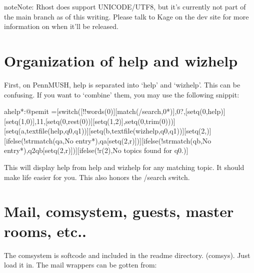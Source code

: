 \documentclass[letterpaper,10pt,english]{sphinxmanual}
\begin{document}
\begin{sphinxadmonition}{note}{Note:}
\sphinxAtStartPar
Rhost does support UNICODE/UTF8, but it’s currently not part of the main
branch as of this writing.  Please talk to Kage on the dev site for more
information on when it’ll be released.
\end{sphinxadmonition}


\section{Organization of help and wizhelp}
\label{\detokenize{differences:organization-of-help-and-wizhelp}}
\sphinxAtStartPar
First, on PennMUSH, help is separated into ‘help’ and ‘wizhelp’.  This can
be confusing. If you want to ‘combine’ them, you may use the following snippit:

\begin{sphinxVerbatim}[commandchars=\\\{\}]
\PYGZdl{}ahelp*:@pemit \PYGZpc{}\PYGZsh{}=[switch([!!words(\PYGZpc{}0)][match(/search,\PYGZpc{}0*)],0?,[setq(0,help)][setq(1,0)],11,[setq(0,rest(\PYGZpc{}0))][setq(1,2)],setq(0,trim(\PYGZpc{}0)))][setq(a,textfile(help,\PYGZpc{}q0,\PYGZpc{}q1))][setq(b,textfile(wizhelp,\PYGZpc{}q0,\PYGZpc{}q1))][setq(2,)][ifelse(!strmatch(\PYGZpc{}qa,No entry*),\PYGZpc{}qa[setq(2,\PYGZpc{}r)])][ifelse(!strmatch(\PYGZpc{}qb,No entry*),\PYGZpc{}q2\PYGZpc{}qb[setq(2,\PYGZpc{}r)])][ifelse(!\PYGZdl{}r(2),No topics found for \PYGZsq{}\PYGZpc{}q0\PYGZsq{}.)]
\end{sphinxVerbatim}

\sphinxAtStartPar
This will display help from help and wizhelp for any matching topic.  It
should make life easier for you.  This also honors the /search switch.


\section{Mail, comsystem, guests, master rooms, etc..}
\label{\detokenize{differences:mail-comsystem-guests-master-rooms-etc}}
\sphinxAtStartPar
The comsystem is softcode and included in the readme directory. (comsys).
Just load it in.  The mail wrappers can be gotten from:

\begin{sphinxVerbatim}[commandchars=\\\{\}]
      
\end{sphinxVerbatim}
\end{document}
